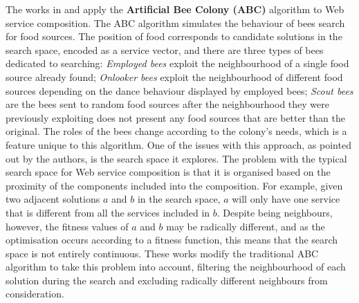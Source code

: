 The works in \cite{zhang2010qos} and \cite{wang2013improved} apply the \textbf{Artificial Bee Colony (ABC)} algorithm to Web service composition. The ABC algorithm simulates the behaviour of bees search for food sources. The position of food corresponds to candidate solutions in the search space, encoded as a service vector, and there are three types of bees dedicated to searching: \textit{Employed bees} exploit the neighbourhood of a single food source already found; \textit{Onlooker bees} exploit the neighbourhood of different food sources depending on the dance behaviour displayed by employed bees; \textit{Scout bees} are the bees sent to random food sources after the neighbourhood they were previously exploiting does not present any food sources that are better than the original. The roles of the bees change according to the colony's needs, which is a feature unique to this algorithm. One of the issues with this approach, as pointed out by the authors, is the search space it explores. The problem with the typical search space for Web service composition is that it is organised based on the proximity of the components included into the composition. For example, given two adjacent solutions $a$ and $b$ in the search space, $a$ will only have one service that is different from all the services included in $b$. Despite being neighbours, however, the fitness values of $a$ and $b$ may be radically different, and as the optimisation occurs according to a fitness function, this means that the search space is not entirely continuous. These works modify the traditional ABC algorithm to take this problem into account, filtering the neighbourhood of each solution during the search and excluding radically different neighbours from consideration.

